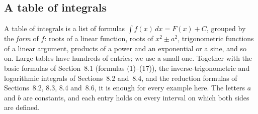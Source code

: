\documentclass[11pt]{article}
\begin{document}
\subsection*{A table of integrals}

A table of integrals is a list of formulas $\int f(x)\,dx=F(x)+C$, grouped by the \emph{form} of $f$: roots of a linear function, roots of $x^2\pm a^2$, trigonometric functions of a linear argument, products of a power and an exponential or a sine, and so on. Large tables have hundreds of entries; we use a small one. Together with the basic formulas of Section~8.1 (formulas (1)--(17)), the inverse-trigonometric and logarithmic integrals of Sections~8.2 and~8.4, and the reduction formulas of Sections~8.2, 8.3, 8.4 and~8.6, it is enough for every example here. The letters $a$ and $b$ are constants, and each entry holds on every interval on which both sides are defined.
\end{document}
